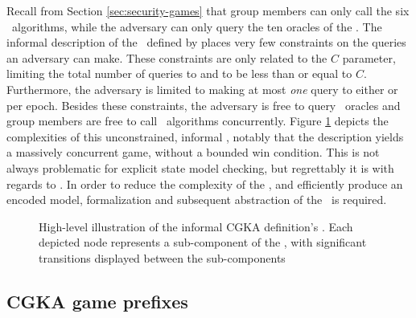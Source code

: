 Recall from Section \ref{sec:security-games} that group members can only call the six \CGKAdef\ algorithms, while the adversary can only query the ten oracles of the \CGKAsec.
The informal description of the \CGKAsec\ defined by \autocite{alwen2020security} places very few constraints on the queries an adversary can make.
These constraints are only related to the \(C\) parameter, limiting the total number of queries to  and  to be less than or equal to \(C\).
Furthermore, the adversary is limited to making at most \emph{one} query to either  or  per epoch.
Besides these constraints, the adversary is free to query \CGKAsec\ oracles and group members are free to call \CGKAdef\ algorithms concurrently.
Figure \ref{fig:CGKA-informal} depicts the complexities of this unconstrained, informal \CGKAsec, notably that the description yields a massively concurrent game, without a bounded win condition.
This is not always problematic for explicit state model checking, but regrettably it is with regards to \CGKAsec.
In order to reduce the complexity of the \CGKAsec, and efficiently produce an encoded model, formalization and subsequent abstraction of the \CGKAsec\ is required.

\begin{figure}[ht!]
\centering
\caption[Transition graph of informal CGKA definition]{%
\label{fig:CGKA-informal}%
High-level illustration of the informal CGKA definition's .%
Each depicted node represents a sub-component of the , with significant transitions displayed between the sub-components
}%
\end{figure}

\hypertarget{sec:game-prefixes}{%
\subsection{CGKA game prefixes}\label{sec:game-prefixes}}

